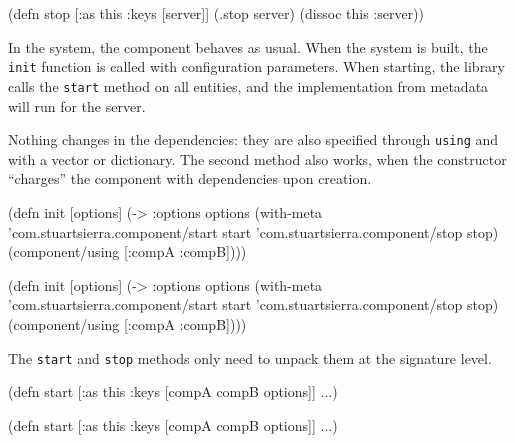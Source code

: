 \begin{english}
  \begin{clojure}
(defn stop
  [{:as this :keys [server]}]
  (.stop server)
  (dissoc this :server))
  \end{clojure}
\end{english}

In the system, the component behaves as usual. When the system is built, the \verb|init| function is called with configuration parameters. When starting, the library calls the \verb|start| method on all entities, and the implementation from metadata will run for the server.

Nothing changes in the dependencies: they are also specified through \verb|using| and with a vector or dictionary. The second method also works, when the constructor ``charges'' the component with dependencies upon creation.

\ifnarrow

\begin{english}
  \begin{clojure}
(defn init [options]
  (->
    {:options options}
    (with-meta
     {'com.stuartsierra.component/start
      start
      'com.stuartsierra.component/stop
      stop})
    (component/using [:compA :compB])))
  \end{clojure}
\end{english}

\else

\begin{english}
  \begin{clojure}
(defn init [options]
  (-> {:options options}
      (with-meta
        {'com.stuartsierra.component/start start
         'com.stuartsierra.component/stop stop})
      (component/using [:compA :compB])))
  \end{clojure}
\end{english}

\fi

\noindent
The \verb|start| and \verb|stop| methods only need to unpack them at the signature level.

\ifnarrow

\begin{english}
  \begin{clojure}
(defn start
  [{:as this
    :keys [compA compB options]}]
  ...)
  \end{clojure}
\end{english}

\else

\begin{english}
  \begin{clojure}
(defn start
  [{:as this :keys [compA compB options]}]
  ...)
  \end{clojure}
\end{english}

